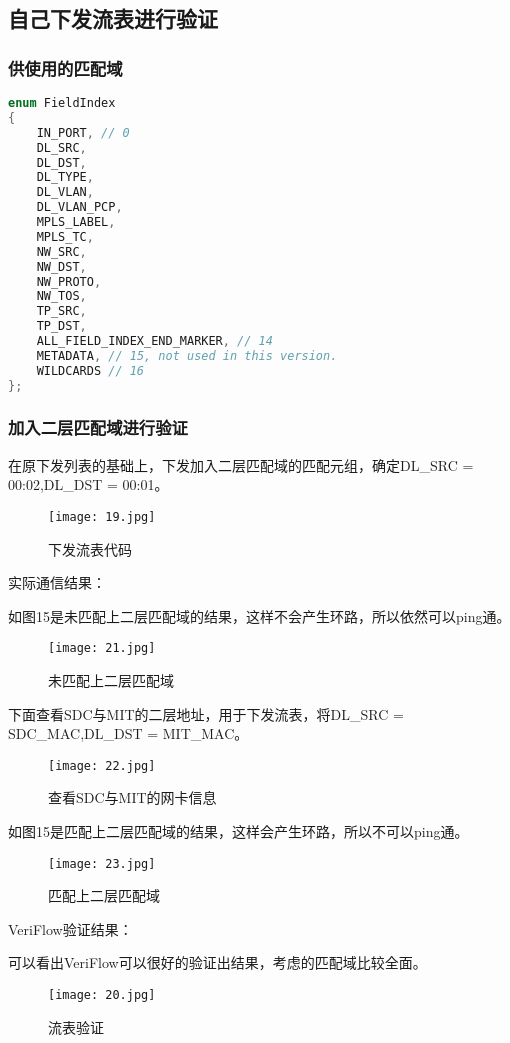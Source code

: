 \documentclass{xjtureport}
\begin{document}
\subsection{自己下发流表进行验证}
\subsubsection{供使用的匹配域}
\begin{lstlisting}[language=c++]
enum FieldIndex
{
	IN_PORT, // 0
	DL_SRC,
	DL_DST,
	DL_TYPE,
	DL_VLAN,
	DL_VLAN_PCP,
	MPLS_LABEL,
	MPLS_TC,
	NW_SRC,
	NW_DST,
	NW_PROTO,
	NW_TOS,
	TP_SRC,
	TP_DST,
	ALL_FIELD_INDEX_END_MARKER, // 14
	METADATA, // 15, not used in this version.
	WILDCARDS // 16
};
\end{lstlisting}
\subsubsection{加入二层匹配域进行验证}
在原下发列表的基础上，下发加入二层匹配域的匹配元组，确定DL\_SRC = 00:02,DL\_DST = 00:01。
\begin{figure}[H]
	\centering
	\texttt{[image: 19.jpg]}
	\caption{下发流表代码}
\end{figure}
实际通信结果：\par
如图15是未匹配上二层匹配域的结果，这样不会产生环路，所以依然可以ping通。
\begin{figure}[H]
	\centering
	\texttt{[image: 21.jpg]}
	\caption{未匹配上二层匹配域}
\end{figure}
下面查看SDC与MIT的二层地址，用于下发流表，将DL\_SRC = SDC\_MAC,DL\_DST = MIT\_MAC。
\begin{figure}[H]
	\centering
	\texttt{[image: 22.jpg]}
	\caption{查看SDC与MIT的网卡信息}
\end{figure}
如图15是匹配上二层匹配域的结果，这样会产生环路，所以不可以ping通。
\begin{figure}[H]
	\centering
	\texttt{[image: 23.jpg]}
	\caption{匹配上二层匹配域}
\end{figure}
VeriFlow验证结果：\par
可以看出VeriFlow可以很好的验证出结果，考虑的匹配域比较全面。\par
\begin{figure}[H]
	\centering
	\texttt{[image: 20.jpg]}
	\caption{流表验证}
\end{figure}
\end{document}
